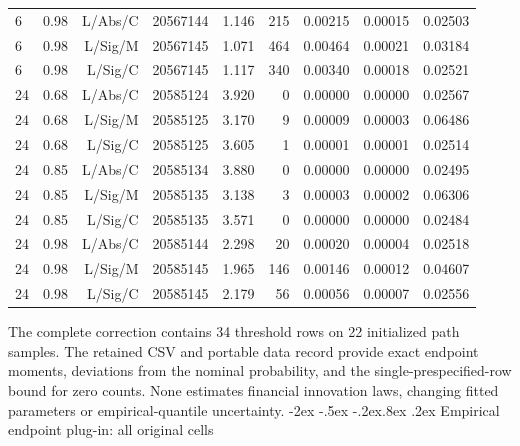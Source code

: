 \documentclass[10pt,a4paper]{article}
\makeatletter
\renewcommand\section{\@startsection{section}{1}{\z@}%
  {-2ex \@plus -.5ex \@minus -.2ex}{.8ex \@plus .2ex}%
  {\normalfont\large\bfseries}}
\makeatother
\begin{document}
\begin{longtable}{lrrrrrrrr}
6 & 0.98 & L/Abs/C & 20567144 & 1.146 & 215 & 0.00215 & 0.00015 & 0.02503 \\
6 & 0.98 & L/Sig/M & 20567145 & 1.071 & 464 & 0.00464 & 0.00021 & 0.03184 \\
6 & 0.98 & L/Sig/C & 20567145 & 1.117 & 340 & 0.00340 & 0.00018 & 0.02521 \\
24 & 0.68 & L/Abs/C & 20585124 & 3.920 & 0 & 0.00000 & 0.00000 & 0.02567 \\
24 & 0.68 & L/Sig/M & 20585125 & 3.170 & 9 & 0.00009 & 0.00003 & 0.06486 \\
24 & 0.68 & L/Sig/C & 20585125 & 3.605 & 1 & 0.00001 & 0.00001 & 0.02514 \\
24 & 0.85 & L/Abs/C & 20585134 & 3.880 & 0 & 0.00000 & 0.00000 & 0.02495 \\
24 & 0.85 & L/Sig/M & 20585135 & 3.138 & 3 & 0.00003 & 0.00002 & 0.06306 \\
24 & 0.85 & L/Sig/C & 20585135 & 3.571 & 0 & 0.00000 & 0.00000 & 0.02484 \\
24 & 0.98 & L/Abs/C & 20585144 & 2.298 & 20 & 0.00020 & 0.00004 & 0.02518 \\
24 & 0.98 & L/Sig/M & 20585145 & 1.965 & 146 & 0.00146 & 0.00012 & 0.04607 \\
24 & 0.98 & L/Sig/C & 20585145 & 2.179 & 56 & 0.00056 & 0.00007 & 0.02556 \\
\end{longtable}
\endgroup

The complete correction contains 34 threshold rows on 22 initialized path samples.
The retained CSV and portable data record provide exact endpoint moments,
deviations from the nominal probability, and the single-prespecified-row bound
for zero counts. None estimates financial innovation laws, changing fitted
parameters or empirical-quantile uncertainty.\section{Empirical endpoint plug-in: all original cells}\label{sup:levy-empirical}
\end{document}
